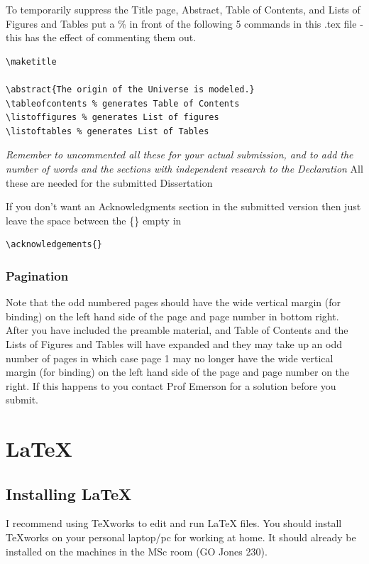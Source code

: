 \documentclass[twoside,fontsize=12pt,
     bibliography=totoc, %
     listof=totoc, %
     index=totoc, %
     onehalfspacing %
]{_MScDiss2017_cls}
\begin{document}
To temporarily suppress the Title page, Abstract, Table of Contents, and Lists of Figures and Tables put a \% in front of the following 5 commands in this .tex file - this has the effect of commenting them out. 
\begin{verbatim}
\maketitle

\abstract{The origin of the Universe is modeled.}
\tableofcontents % generates Table of Contents
\listoffigures % generates List of figures 
\listoftables % generates List of Tables
\end{verbatim}
 
 {\it Remember to uncommented all these for your actual submission, and to add the number of words and the sections with independent research to the Declaration}  All these are needed for the submitted Dissertation

If you don't want an Acknowledgments section in the submitted version then just leave the space between the \{\} empty  in 
\begin{verbatim}\acknowledgements{}\end{verbatim}

\subsection{Pagination}
\label{subsec:sides}
Note that the odd numbered pages should have the wide vertical margin (for binding) on the left hand side of the page and page number in bottom right. After you have included the preamble material, and Table of Contents and the Lists of Figures and Tables will have expanded and they may take up an odd number of pages in which case page 1 may no longer have the wide vertical margin (for binding) on the left hand side of the page and page number on the right. If this happens to you contact Prof Emerson for a solution before you submit.

\chapter{\LaTeX }
\section{Installing \LaTeX}
I recommend using TeXworks to edit and run LaTeX files. You should install TeXworks on your personal laptop/pc for working at home. It should already be installed on the machines in the MSc room (GO Jones 230).
 
\end{document}
